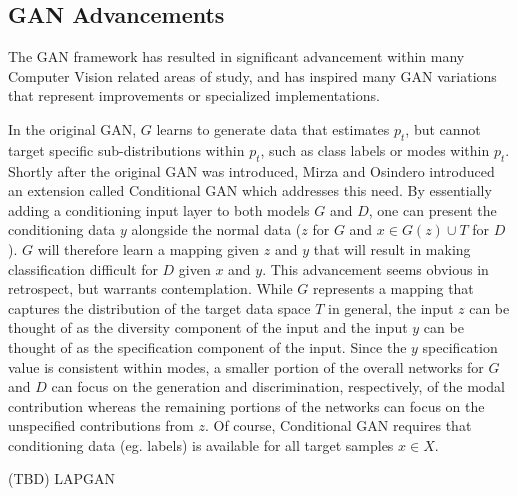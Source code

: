 \documentclass[11pt]{article}
\begin{document}
\subsection{GAN Advancements}
The GAN framework has resulted in significant advancement within many Computer Vision related areas of study, and has inspired many GAN variations that represent improvements or specialized implementations.

In the original GAN, $G$ learns to generate data that estimates $p_t$, but cannot target specific sub-distributions within $p_t$, such as class labels or modes within $p_t$.  Shortly after the original GAN was introduced, Mirza and Osindero introduced an extension called Conditional GAN \cite{mirza2014conditional} which addresses this need.  By essentially adding a conditioning input layer to both models $G$ and $D$, one can present the conditioning data $y$ alongside the normal data ($z$ for $G$ and $x \in G(z) \cup T$ for $D$).  $G$ will therefore learn a mapping given $z$ and $y$ that will result in making classification difficult for $D$ given $x$ and $y$.  This advancement seems obvious in retrospect, but warrants contemplation.  While $G$ represents a mapping that captures the distribution of the target data space $T$ in general, the input $z$ can be thought of as the diversity component of the input and the input $y$ can be thought of as the specification component of the input.  Since the $y$ specification value is consistent within modes, a smaller portion of the overall networks for $G$ and $D$ can focus on the generation and discrimination, respectively, of the modal contribution whereas the remaining portions of the networks can focus on the unspecified contributions from $z$.  Of course, Conditional GAN requires that conditioning data (eg. labels) is available for all target samples $x \in X$.

(TBD) LAPGAN
\end{document}

